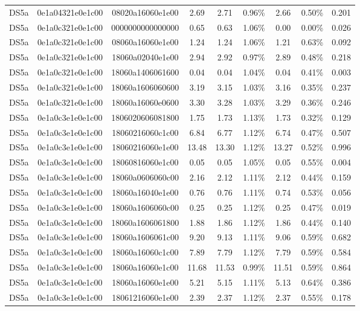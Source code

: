 \begin{tabular}{|c|c c|c|c c|c c|c|}
  DS5a & 0e1a04321e0e1c00 & 08020a16060e1e00 & 2.69 & 2.71 & 0.96\% & 2.66 & 0.50\% & 0.201 \\
  DS5a & 0e1a0c321e0e1c00 & 0000000000000000 & 0.65 & 0.63 & 1.06\% & 0.00 & 0.00\% & 0.026 \\
  DS5a & 0e1a0c321e0e1c00 & 08060a16060e1e00 & 1.24 & 1.24 & 1.06\% & 1.21 & 0.63\% & 0.092 \\
  DS5a & 0e1a0c321e0e1c00 & 18060a02040e1e00 & 2.94 & 2.92 & 0.97\% & 2.89 & 0.48\% & 0.218 \\
  DS5a & 0e1a0c321e0e1c00 & 18060a1406061600 & 0.04 & 0.04 & 1.04\% & 0.04 & 0.41\% & 0.003 \\
  DS5a & 0e1a0c321e0e1c00 & 18060a1606060600 & 3.19 & 3.15 & 1.03\% & 3.16 & 0.35\% & 0.237 \\
  DS5a & 0e1a0c321e0e1c00 & 18060a16060e0600 & 3.30 & 3.28 & 1.03\% & 3.29 & 0.36\% & 0.246 \\
  DS5a & 0e1a0c3e1e0e1c00 & 1806020606081800 & 1.75 & 1.73 & 1.13\% & 1.73 & 0.32\% & 0.129 \\
  DS5a & 0e1a0c3e1e0e1c00 & 18060216060c1c00 & 6.84 & 6.77 & 1.12\% & 6.74 & 0.47\% & 0.507 \\
  DS5a & 0e1a0c3e1e0e1c00 & 18060216060e1e00 & 13.48 & 13.30 & 1.12\% & 13.27 & 0.52\% & 0.996 \\
  DS5a & 0e1a0c3e1e0e1c00 & 18060816060e1c00 & 0.05 & 0.05 & 1.05\% & 0.05 & 0.55\% & 0.004 \\
  DS5a & 0e1a0c3e1e0e1c00 & 18060a0606060c00 & 2.16 & 2.12 & 1.11\% & 2.12 & 0.44\% & 0.159 \\
  DS5a & 0e1a0c3e1e0e1c00 & 18060a16040e1e00 & 0.76 & 0.76 & 1.11\% & 0.74 & 0.53\% & 0.056 \\
  DS5a & 0e1a0c3e1e0e1c00 & 18060a1606060c00 & 0.25 & 0.25 & 1.12\% & 0.25 & 0.47\% & 0.019 \\
  DS5a & 0e1a0c3e1e0e1c00 & 18060a1606061800 & 1.88 & 1.86 & 1.12\% & 1.86 & 0.44\% & 0.140 \\
  DS5a & 0e1a0c3e1e0e1c00 & 18060a1606061c00 & 9.20 & 9.13 & 1.11\% & 9.06 & 0.59\% & 0.682 \\
  DS5a & 0e1a0c3e1e0e1c00 & 18060a16060c1c00 & 7.89 & 7.79 & 1.12\% & 7.79 & 0.59\% & 0.584 \\
  DS5a & 0e1a0c3e1e0e1c00 & 18060a16060e1c00 & 11.68 & 11.53 & 0.99\% & 11.51 & 0.59\% & 0.864 \\
  DS5a & 0e1a0c3e1e0e1c00 & 18060a16060e1e00 & 5.21 & 5.15 & 1.11\% & 5.13 & 0.64\% & 0.386 \\
  DS5a & 0e1a0c3e1e0e1c00 & 18061216060e1e00 & 2.39 & 2.37 & 1.12\% & 2.37 & 0.55\% & 0.178 \\

\end{tabular}
